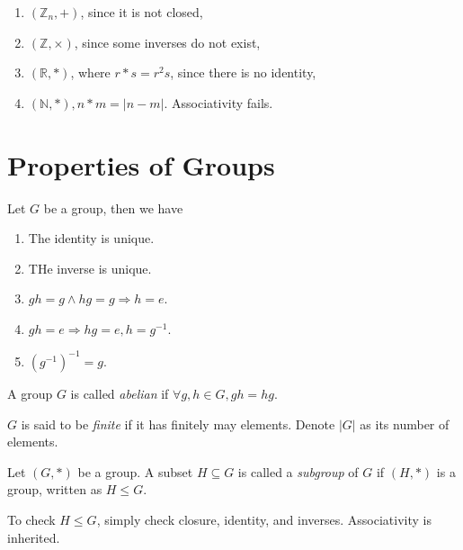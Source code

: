 \documentclass[10pt]{article}
\def\le{\leqslant}
\begin{document}
    \begin{example}
        \begin{enumerate}[(1)]
            \item $ (\mathbb{Z}_n, +) $, since it is not closed,
            \item $ (\mathbb{Z} , \times) $, since some inverses do not exist,
            \item $ (\mathbb{R} , *) $, where $ r*s = r^2 s $, since there is no identity,
            \item $ (\mathbb{N}, *), n*m = |n-m| $. Associativity fails.
        \end{enumerate}
    \end{example}
    \section{Properties of Groups}
    \begin{proposition}\label{prop:groups_properties}
        Let $G$ be a group, then we have 
        \begin{enumerate}
            \item The identity is unique.
            \item THe inverse is unique.
            \item $ gh=g \land hg=g \Rightarrow h=e $.
            \item $ gh=e \Rightarrow hg=e, h=g^{-1} $.
            \item $ (g^{-1})^{-1}=g $.
        \end{enumerate}
    \end{proposition}
    \begin{definition}
        A group $G$ is called \textit{abelian} if $ \forall g,h\in G, gh=hg $.
    \end{definition}
    \begin{definition}
        $G$ is said to be \textit{finite} if it has finitely may elements. Denote $|G|$ as its number of elements.
    \end{definition}
    \begin{definition}
        Let $ (G,*) $ be a group. A subset $H\subseteq G$ is called a \textit{subgroup} of $G$ if $ (H,*) $ is a group, written as $ H\le G $.
    \end{definition}
    \begin{remark}
        To check $ H\le G $, simply check closure, identity, and inverses. Associativity is inherited.
    \end{remark}
\end{document}
